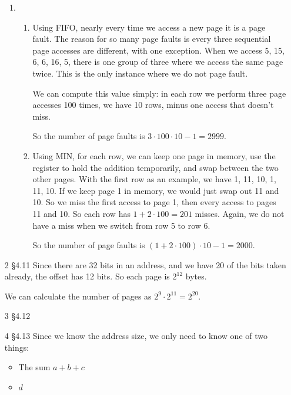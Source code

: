 \documentclass[12pt,letterpaper]{article}
\begin{document}
\begin{enumerate}
\begin{enumerate}
        \item
          \begin{enumerate}
            \item
              Using FIFO, nearly every time we access a new page it is a page fault.
              The reason for so many page faults is every three sequential page accesses are different, with one exception.
              When we access 5, 15, 6, 6, 16, 5, there is one group of three where we access the same page twice.
              This is the only instance where we do not page fault.

              We can compute this value simply:
              in each row we perform three page accesses 100 times,
              we have 10 rows,
              minus one access that doesn't miss.

              So the number of page faults is $3 \cdot 100 \cdot 10 - 1 = 2999$.

            \item
              Using MIN, for each row, we can keep one page in memory,
              use the register to hold the addition temporarily,
              and swap between the two other pages.
              With the first row as an example, we have 1, 11, 10, 1, 11, 10.
              If we keep page 1 in memory, we would just swap out 11 and 10.
              So we miss the first access to page 1, then every access to pages 11 and 10.
              So each row has $1 + 2 \cdot 100 = 201$ misses.
              Again, we do not have a miss when we switch from row 5 to row 6.

              So the number of page faults is $(1 + 2 \cdot 100) \cdot 10 - 1 = 2000$.
          \end{enumerate}
      \end{enumerate}
    \item [2 \S 4.11]
      Since there are 32 bits in an address, and we have 20 of the bits taken already, the offset has 12 bits.
      So each page is $2^{12}$ bytes.

      We can calculate the number of pages as $2^9 \cdot 2^{11} = 2^{20}$.

    \item [3 \S 4.12]

    \item [4 \S 4.13]
      Since we know the address size, we only need to know one of two things:

      \begin{itemize}
        \item The sum $a + b + c$
        \item $d$
      \end{itemize}


\end{enumerate}
\end{document}
